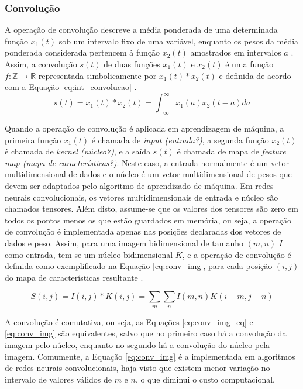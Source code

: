 \subsubsection{Convolução}
A operação de convolução descreve a média ponderada de uma determinada função $x_1(t)$ sob um intervalo fixo de uma variável, enquanto os pesos da média ponderada considerada pertencem à função $x_2(t)$ amostrados em intervalos $a$ \cite{bracewell1986fourier}. Assim, a convolução $s(t)$ de duas funções $x_1(t)$ e $x_2(t)$ é uma função $f: \mathds{Z} \rightarrow \mathds{R}$ representada simbolicamente por $x_1(t) * x_2(t)$ e definida de acordo com a Equação \ref{eq:int_convolucao} \cite{lathi2006sinais}.
\begin{equation}\label{eq:int_convolucao}
	s(t) = x_1(t) * x_2(t) = \int_{-\infty}^{\infty} x_1(a) x_2(t-a)da
\end{equation}

Quando a operação de convolução é aplicada em aprendizagem de máquina, a primeira função $x_1(t)$ é chamada de \emph{input (entrada?)}, a segunda função $x_2(t)$ é chamada de \emph{kernel (núcleo?)}, e a saída $s(t)$ é chamada de mapa de \emph{feature map (mapa de características?)}. Neste caso, a entrada normalmente é um vetor multidimensional de dados e o núcleo é um vetor multidimensional de pesos que devem ser adaptados pelo algoritmo de aprendizado de máquina. Em redes neurais convolucionais, os vetores multidimensionais de entrada e núcleo são chamados tensores. Além disto, assume-se que os valores dos tensores são zero em todos os pontos menos os que estão guardados em memória, ou seja, a operação de convolução é implementada apenas nas posições declaradas dos vetores de dados e peso. Assim, para uma imagem bidimensional de tamanho $(m,n)$ $I$ como entrada, tem-se um núcleo bidimensional $K$, e a operação de convolução é definida como exemplificado na Equação \ref{eq:conv_img}, para cada posição $(i,j)$ do mapa de características resultante \cite{goodfellow2016deep}.

\begin{equation}\label{eq:conv_img}
	S(i,j) = I(i,j)*K(i,j) = \sum_{m}\sum_{n}I(m,n)K(i-m,j-n)
\end{equation}

A convolução é comutativa, ou seja, as Equações \ref{eq:conv_img_eq} e \ref{eq:conv_img} são equivalentes, salvo que no primeiro caso há a convolução da imagem pelo núcleo, enquanto no segundo há a convolução do núcleo pela imagem. Comumente, a Equação \ref{eq:conv_img} é a implementada em algoritmos de redes neurais convolucionais, haja visto que existem menor variação no intervalo de valores válidos de $m$ e $n$, o que diminui o custo computacional.

